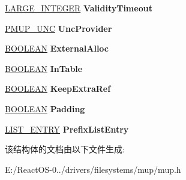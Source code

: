 \begin{DoxyCompactItemize}
\hyperlink{union___l_a_r_g_e___i_n_t_e_g_e_r}{L\+A\+R\+G\+E\+\_\+\+I\+N\+T\+E\+G\+ER} {\bfseries Validity\+Timeout}
\item 
\mbox{\label{struct___m_u_p___p_f_x_a17fc960e3037509c3113ec3217d8ff56}} 
\hyperlink{struct___m_u_p___u_n_c}{P\+M\+U\+P\+\_\+\+U\+NC} {\bfseries Unc\+Provider}
\item 
\mbox{\label{struct___m_u_p___p_f_x_ad8cc5382f31dab8e96d7355a38ca5b5e}} 
\hyperlink{_processor_bind_8h_a112e3146cb38b6ee95e64d85842e380a}{B\+O\+O\+L\+E\+AN} {\bfseries External\+Alloc}
\item 
\mbox{\label{struct___m_u_p___p_f_x_ad1e3b354a508abed3445f6f6eac72764}} 
\hyperlink{_processor_bind_8h_a112e3146cb38b6ee95e64d85842e380a}{B\+O\+O\+L\+E\+AN} {\bfseries In\+Table}
\item 
\mbox{\label{struct___m_u_p___p_f_x_af20f0dbb2210cfdf92612aabba199240}} 
\hyperlink{_processor_bind_8h_a112e3146cb38b6ee95e64d85842e380a}{B\+O\+O\+L\+E\+AN} {\bfseries Keep\+Extra\+Ref}
\item 
\mbox{\label{struct___m_u_p___p_f_x_a8ca9855633502b87d98ca117afa76224}} 
\hyperlink{_processor_bind_8h_a112e3146cb38b6ee95e64d85842e380a}{B\+O\+O\+L\+E\+AN} {\bfseries Padding}
\item 
\mbox{\label{struct___m_u_p___p_f_x_a4bd09848a2f66faa6993c32fdbe44e8d}} 
\hyperlink{struct___l_i_s_t___e_n_t_r_y}{L\+I\+S\+T\+\_\+\+E\+N\+T\+RY} {\bfseries Prefix\+List\+Entry}
\end{DoxyCompactItemize}


该结构体的文档由以下文件生成\+:\begin{DoxyCompactItemize}
\item 
E\+:/\+React\+O\+S-\/0../drivers/filesystems/mup/mup.\+h\end{DoxyCompactItemize}
